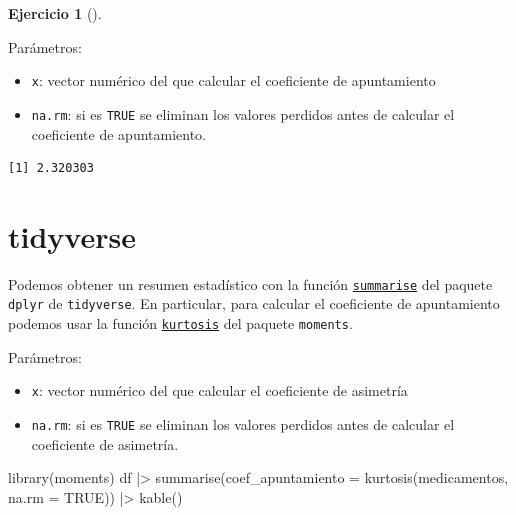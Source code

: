 \documentclass[
  spanish,
  a4paper,
]{scrreport}
\newenvironment{Shaded}{\begin{snugshade}}{\end{snugshade}}
\newcommand{\AttributeTok}[1]{\textcolor[rgb]{0.40,0.45,0.13}{#1}}
\newcommand{\ConstantTok}[1]{\textcolor[rgb]{0.56,0.35,0.01}{#1}}
\newcommand{\FunctionTok}[1]{\textcolor[rgb]{0.28,0.35,0.67}{#1}}
\newcommand{\NormalTok}[1]{\textcolor[rgb]{0.00,0.23,0.31}{#1}}
\newcommand{\SpecialCharTok}[1]{\textcolor[rgb]{0.37,0.37,0.37}{#1}}
\providecommand{\tightlist}{%
  \setlength{\itemsep}{0pt}\setlength{\parskip}{0pt}}
\theoremstyle{definition}
\newtheorem{exercise}{Ejercicio}[chapter]
\theoremstyle{remark}
\begin{document}
\begin{exercise}[]
\begin{enumerate}
\begin{tcolorbox}
  Parámetros:

  \begin{itemize}
  \tightlist
  \item
    \texttt{x}: vector numérico del que calcular el coeficiente de
    apuntamiento
  \item
    \texttt{na.rm}: si es \texttt{TRUE} se eliminan los valores perdidos
    antes de calcular el coeficiente de apuntamiento.
  \end{itemize}

\begin{Shaded}
\end{Shaded}

\begin{verbatim}
[1] 2.320303
\end{verbatim}

  \section{tidyverse}

  Podemos obtener un resumen estadístico con la función
  \href{https://dplyr.tidyverse.org/reference/summarise.html}{\texttt{summarise}}
  del paquete \texttt{dplyr} de \texttt{tidyverse}. En particular, para
  calcular el coeficiente de apuntamiento podemos usar la función
  \href{https://www.rdocumentation.org/packages/moments/versions/0.14/topics/kurtosis}{\texttt{kurtosis}}
  del paquete \texttt{moments}.

  Parámetros:

  \begin{itemize}
  \tightlist
  \item
    \texttt{x}: vector numérico del que calcular el coeficiente de
    asimetría
  \item
    \texttt{na.rm}: si es \texttt{TRUE} se eliminan los valores perdidos
    antes de calcular el coeficiente de asimetría.
  \end{itemize}

\begin{Shaded}
\begin{Highlighting}[]
\FunctionTok{library}\NormalTok{(moments)}
\NormalTok{df }\SpecialCharTok{|\textgreater{}} \FunctionTok{summarise}\NormalTok{(}\AttributeTok{coef\_apuntamiento =} \FunctionTok{kurtosis}\NormalTok{(medicamentos, }\AttributeTok{na.rm =} \ConstantTok{TRUE}\NormalTok{)) }\SpecialCharTok{|\textgreater{}} 
    \FunctionTok{kable}\NormalTok{()}
\end{Highlighting}
\end{Shaded}


\end{tcolorbox}
\end{enumerate}
\end{exercise}
\end{document}
